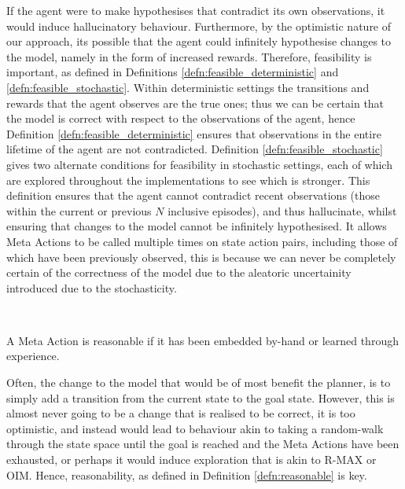 If the agent were to make hypothesises that contradict its own observations, it would induce hallucinatory behaviour. Furthermore, by the optimistic nature of our approach, its possible that the agent could infinitely hypothesise changes to the model, namely in the form of increased rewards. Therefore, feasibility is important, as defined in Definitions \ref{defn:feasible_deterministic} and \ref{defn:feasible_stochastic}. Within deterministic settings the transitions and rewards that the agent observes are the true ones; thus we can be certain that the model is correct with respect to the observations of the agent, hence Definition \ref{defn:feasible_deterministic} ensures that observations in the entire lifetime of the agent are not contradicted. Definition \ref{defn:feasible_stochastic} gives two alternate conditions for feasibility in stochastic settings, each of which are explored throughout the implementations to see which is stronger. This definition ensures that the agent cannot contradict recent observations (those within the current or previous $N$ inclusive episodes), and thus hallucinate, whilst ensuring that changes to the model cannot be infinitely hypothesised. It allows Meta Actions to be called multiple times on state action pairs, including those of which have been previously observed, this is because we can never be completely certain of the correctness of the model due to the aleatoric uncertainity introduced due to the stochasticity.


\\
\begin{defn}
\label{defn:reasonable}
A Meta Action is reasonable if it has been embedded by-hand or learned through experience.
\end{defn}
Often, the change to the model that would be of most benefit the planner, is to simply add a transition from the current state to the goal state. However, this is almost never going to be a change that is realised to be correct, it is too optimistic, and instead would lead to behaviour akin to taking a random-walk through the state space until the goal is reached and the Meta Actions have been exhausted, or perhaps it would induce exploration that is akin to R-MAX or OIM. Hence, reasonability, as defined in Definition \ref{defn:reasonable} is key.

